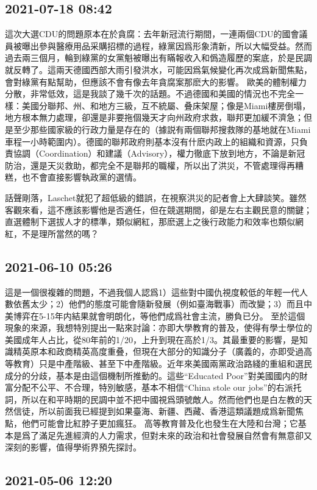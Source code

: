\documentclass[twocolumn]{ctexart}
\begin{document}
\subsection*{2021-07-18 08:42}

這次大選CDU的問題原本在於貪腐：去年新冠流行期間，一連兩個CDU的國會議員被曝出參與醫療用品采購招標的過程，綠黨因爲形象清新，所以大幅受益。然而過去兩三個月，輪到綠黨的女黨魁被曝出有瞞報收入和僞造履歷的案底，於是民調就反轉了。這兩天德國西部大雨引發洪水，可能因爲氣候變化再次成爲新聞焦點，會對綠黨有點幫助，但應該不會有像去年貪腐案那麽大的影響。
歐美的體制權力分散，非常低效，這是我談了幾千次的話題。不過德國和美國的情況也不完全一樣：美國分聯邦、州、和地方三級，互不統屬、叠床架屋；像是Miami樓房倒塌，地方根本無力處理，卻還是非要拖個幾天才向州政府求救，聯邦更加緩不濟急；但是至少那些國家級的行政力量是存在的（據説有兩個聯邦搜救隊的基地就在Miami車程一小時範圍内）。德國的聯邦政府則基本沒有什麽内政上的組織和資源，只負責協調（Coordination）和建議（Advisory），權力徹底下放到地方，不論是新冠防治，還是天災救助，都完全不是聯邦的職權，所以出了洪災，不管處理得再糟糕，也不會直接影響執政黨的選情。

話聲剛落，Laschet就犯了超低級的錯誤，在視察洪災的記者會上大肆談笑。雖然客觀來看，這不應該影響他是否適任，但在競選期間，卻是左右主觀民意的關鍵；直選體制下選拔人才的標準，類似網紅，那麽選上之後行政能力和效率也類似網紅，不是理所當然的嗎？
\subsection*{2021-06-10 05:26}

這是一個很複雜的問題，不過我個人認爲1）這些對中國仇視度較低的年輕一代人數依舊太少；2）他們的態度可能會隨新發展（例如臺海戰事）而改變；3）而且中美博弈在5-15年内結果就會明朗化，等他們成爲社會主流，勝負已分。
至於這個現象的來源，我想特別提出一點來討論：亦即大學教育的普及，使得有學士學位的美國成年人占比，從80年前的1/20，上升到現在高於1/3。其最重要的影響，是知識精英原本和政商精英高度重叠，但現在大部分的知識分子（廣義的，亦即受過高等教育）只是中產階級、甚至下中產階級。近年來美國兩黨政治路綫的重組和選民成分的分歧，基本是由這個機制所推動的。這些“Educated Poor”對美國國内的財富分配不公平、不合理，特別敏感，基本不相信“China stole our jobs”的右派托詞，所以在和平時期的民調中並不把中國視爲頭號敵人。然而他們也是白左教的天然信徒，所以前面我已經提到如果臺海、新疆、西藏、香港這類議題成爲新聞焦點，他們可能會比紅脖子更加瘋狂。
高等教育普及化也發生在大陸和台灣；它基本是爲了滿足先進經濟的人力需求，但對未來的政治和社會發展自然會有無意卻又深刻的影響，值得學術界預先探討。
\subsection*{2021-05-06 12:20}
\end{document}
